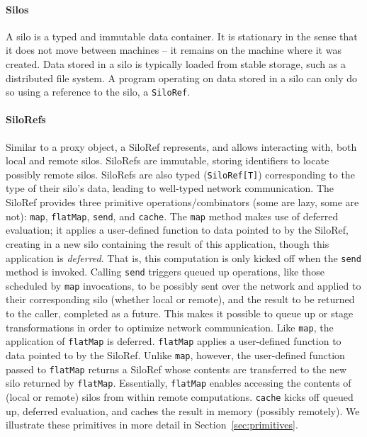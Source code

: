 \documentclass[10pt]{sigplanconf}
\theoremstyle{definition}
\theoremstyle{definition}
\begin{document}
\paragraph{Silos}

A silo is a typed and immutable data container. It is stationary in the sense
that it does not move between machines -- it remains on the machine where it was
created. Data stored in a silo is typically loaded from stable storage, such as
a distributed file system. A program operating on data stored in a silo can only
do so using a reference to the silo, a \verb|SiloRef|.

\paragraph{SiloRefs}

Similar to a proxy object, a SiloRef represents, and allows interacting with,
both local and remote silos. SiloRefs are immutable, storing identifiers to
locate possibly remote silos. SiloRefs are also typed (\verb|SiloRef[T]|)
corresponding to the type of their silo's data, leading to well-typed network
communication. The SiloRef provides three primitive operations/combinators (some
are lazy, some are not): \verb|map|, \verb|flatMap|, \verb|send|, and
\verb|cache|. The \verb|map| method makes use of deferred evaluation; it applies
a user-defined function to data pointed to by the SiloRef, creating in a new
silo containing the result of this application, though this application is
\textit{deferred}. That is, this computation is only kicked off when the
\verb|send| method is invoked. Calling \verb|send| triggers queued up
operations, like those scheduled by \verb|map| invocations, to be possibly sent
over the network and applied to their corresponding silo (whether local or
remote), and the result to be returned to the caller, completed as a future.
This makes it possible to queue up or stage transformations in order to optimize
network communication. Like \verb|map|, the application of \verb|flatMap| is
deferred. \verb|flatMap| applies a user-defined function to data pointed to by
the SiloRef. Unlike \verb|map|, however, the user-defined function passed to
\verb|flatMap| returns a SiloRef whose contents are transferred to the new silo
returned by \verb|flatMap|. Essentially, \verb|flatMap| enables accessing the
contents of (local or remote) silos from within remote computations.
\verb|cache| kicks off queued up, deferred evaluation, and caches the result in
memory (possibly remotely). We illustrate these primitives in more detail in
Section~\ref{sec:primitives}.
\end{document}
